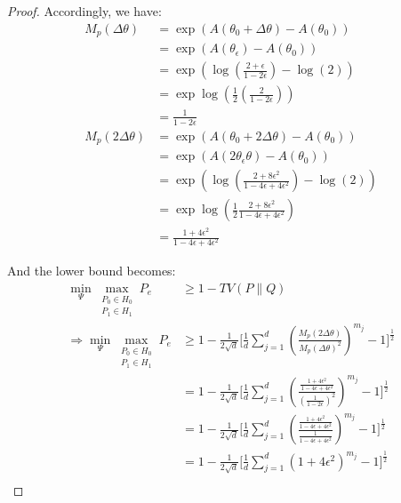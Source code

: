 \begin{proof}
Accordingly, we have:
\begin{align*}
M_p(\Delta \theta) 
    &= \exp\left( A(\theta_0 + \Delta \theta) - A(\theta_0)\right)\\
    &= \exp\left( A(\theta_\epsilon) - A(\theta_0)\right)\\
    &=\exp\left( \log\left(\frac{2+\epsilon}{1-2\epsilon}\right) - \log(2) \right)\\
    &=\exp\log\left(\frac{1}{2}\left(\frac{2}{1-2\epsilon}\right) \right)\\
    &=\frac{1}{1-2\epsilon}\\
M_p(2\Delta \theta) 
    &= \exp\left( A(\theta_0 +2 \Delta \theta) - A(\theta_0)\right)\\
    &= \exp\left( A(2 \theta_\epsilon \theta) - A(\theta_0)\right)\\
    &= \exp\left( \log\left(\frac{2+8\epsilon^2}{1-4\epsilon+4\epsilon^2}\right)- \log(2)\right) \\
    &=\exp \log \left(\frac{1}{2}\frac{2+8\epsilon^2}{1-4\epsilon+4\epsilon^2}\right)\\
    &=\frac{1+4\epsilon^2}{1-4\epsilon+4\epsilon^2}
\end{align*}

And the lower bound becomes:
\begin{align*}
    \min _{\Psi} 
    \max _{\substack{P_0 \in H_0 \\ P_1 \in H_1}}
        P_e 
        &\geq 
        1 - TV(P\parallel Q)\\
      \Rightarrow
      \min _{\Psi} 
    \max _{\substack{P_0 \in H_0 \\ P_1 \in H_1}}
        P_e 
        &\geq 1 - \frac{1}{2\sqrt{d}} 
        \Bigg[ \frac{1}{d} \sum_{j=1}^d
            \left(\frac{M_p(2\Delta\theta)}{M_p(\Delta \theta)^2}\right)^{m_j}
            -
            1
            \Bigg]^{\frac{1}{2}}\\
        &= 1 - \frac{1}{2\sqrt{d}} 
        \Bigg[ \frac{1}{d} \sum_{j=1}^d
            \left(\frac{\frac{1+4\epsilon^2}{1-4\epsilon+4\epsilon^2}}{\left(\frac{1}{1-2\epsilon}\right)^2}\right)^{m_j}
            -
            1
            \Bigg]^{\frac{1}{2}}\\
        &= 1 - \frac{1}{2\sqrt{d}} 
        \Bigg[ \frac{1}{d} \sum_{j=1}^d
            \left(\frac{\frac{1+4\epsilon^2}{1-4\epsilon+4\epsilon^2}}{\frac{1}{1-4\epsilon+4\epsilon^2}}\right)^{m_j}
            -
            1
            \Bigg]^{\frac{1}{2}}\\
        &= 1 - \frac{1}{2\sqrt{d}} 
        \Bigg[ \frac{1}{d} \sum_{j=1}^d
            \left(1+4\epsilon^2\right)^{m_j}
            -
            1
            \Bigg]^{\frac{1}{2}}\\
\end{align*}

\end{proof}


